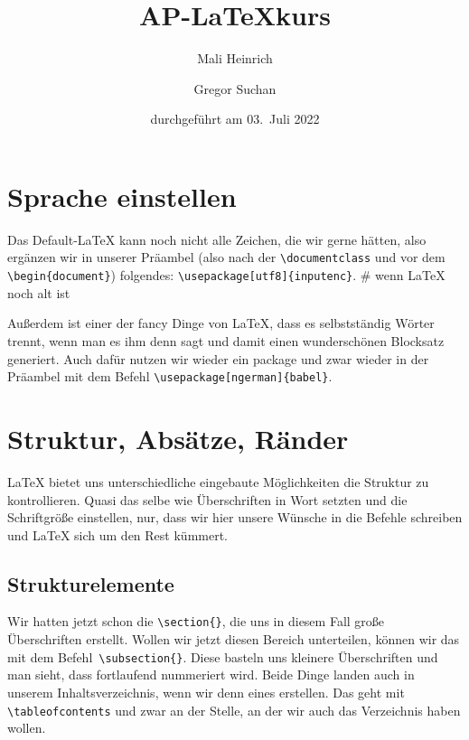 \documentclass[a4paper]{article}
\title{AP-\LaTeX kurs}
\author{Mali Heinrich \and Gregor Suchan}
\date{durchgeführt am 03.~Juli 2022}
\begin{document}
\maketitle

\tableofcontents
\section{Sprache einstellen}
Das Default-\LaTeX{} kann noch nicht alle Zeichen, die wir gerne hätten, also
ergänzen wir in unserer Präambel (also nach der \verb|\documentclass| und vor
dem \verb|\begin{document}|) folgendes: \verb|\usepackage[utf8]{inputenc}|. \#
wenn \LaTeX{} noch alt ist

Außerdem ist einer der fancy Dinge von \LaTeX, dass es selbstständig Wörter
trennt, wenn man es ihm denn sagt und damit einen wunderschönen Blocksatz
generiert.
Auch dafür nutzen wir wieder ein package und zwar wieder in der
Präambel mit dem Befehl \verb|\usepackage[ngerman]{babel}|.

\section{Struktur, Absätze, Ränder}
\LaTeX{} bietet uns unterschiedliche eingebaute Möglichkeiten die Struktur zu
kontrollieren.
Quasi das selbe wie Überschriften in Wort setzten und die Schriftgröße
einstellen, nur, dass wir hier unsere Wünsche in die Befehle schreiben und
\LaTeX{} sich um den Rest kümmert.

\subsection{Strukturelemente}
Wir hatten jetzt schon die \verb|\section{}|, die uns in diesem Fall große
Überschrif\-ten erstellt.
Wollen wir jetzt diesen Bereich unterteilen, können wir das mit dem
Befehl~\verb|\subsection{}|.
Diese basteln uns kleinere Überschriften und man sieht, dass fortlaufend
nummeriert wird.
Beide Dinge landen auch in unserem Inhaltsverzeichnis, wenn wir denn eines
erstellen.
Das geht mit \verb|\tableofcontents| und zwar an der Stelle, an der wir auch
das Verzeichnis haben wollen.
\end{document}
